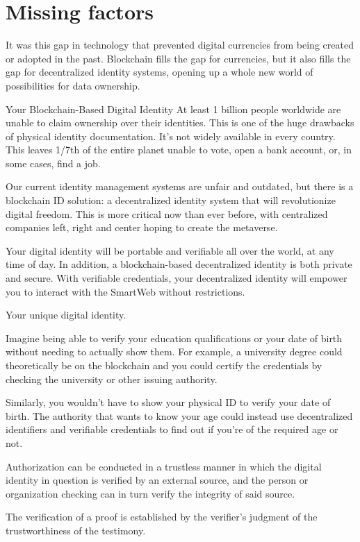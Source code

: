  

\section{Missing factors}
It was this gap in technology that prevented digital currencies from being created or adopted in the past. Blockchain fills the gap for currencies, but it also fills the gap for decentralized identity systems, opening up a whole new world of possibilities for data ownership.

Your Blockchain-Based Digital Identity
At least 1 billion people worldwide are unable to claim ownership over their identities. This is one of the huge drawbacks of physical identity documentation. It's not widely available in every country. This leaves 1/7th of the entire planet unable to vote, open a bank account, or, in some cases, find a job. 

Our current identity management systems are unfair and outdated, but there is a blockchain ID solution: a decentralized identity system that will revolutionize digital freedom. This is more critical now than ever before, with centralized companies left, right and center hoping to create the metaverse.

Your digital identity will be portable and verifiable all over the world, at any time of day. In addition, a blockchain-based decentralized identity is both private and secure. With verifiable credentials, your decentralized identity will empower you to interact with the SmartWeb without restrictions.

Your unique digital identity.

Imagine being able to verify your education qualifications or your date of birth without needing to actually show them. For example, a university degree could theoretically be on the blockchain and you could certify the credentials by checking the university or other issuing authority. 

Similarly, you wouldn't have to show your physical ID to verify your date of birth. The authority that wants to know your age could instead use decentralized identifiers and verifiable credentials to find out if you're of the required age or not.

Authorization can be conducted in a trustless manner in which the digital identity in question is verified by an external source, and the person or organization checking can in turn verify the integrity of said source. 

The verification of a proof is established by the verifier's judgment of the trustworthiness of the testimony.

